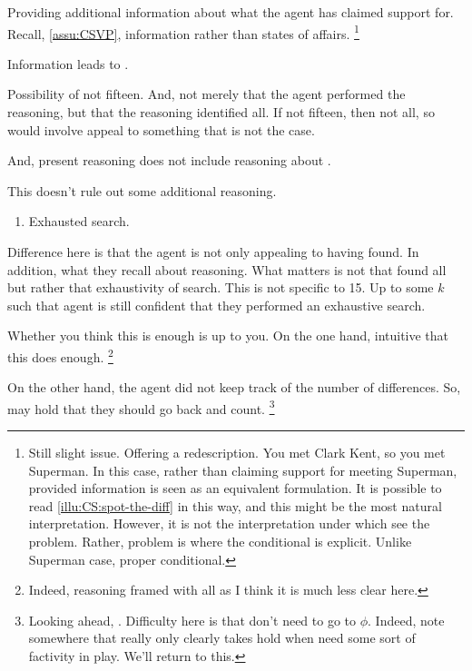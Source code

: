 \begin{note}
    Providing additional information about what the agent has claimed support for.
  Recall, \autoref{assu:CSVP}, information rather than states of affairs.
  \nolinebreak
  \footnote{
    Still slight issue.
    Offering a redescription.
    You met Clark Kent, so you met Superman.
    In this case, rather than claiming support for meeting Superman, provided information is seen as an equivalent formulation.
    It is possible to read \autoref{illu:CS:spot-the-diff} in this way, and this might be the most natural interpretation.
    However, it is not the interpretation under which see the problem.
    Rather, problem is where the conditional is explicit.
    Unlike Superman case, proper conditional.
  }
\end{note}

\begin{note}
  Information leads to \requ{}.

  Possibility of not fifteen.
  And, not merely that the agent performed the reasoning, but that the reasoning identified all.
  If not fifteen, then not all, so would involve appeal to something that is not the case.

  And, present reasoning does not include reasoning about \requ{}.
\end{note}

\begin{note}
  This doesn't rule out some additional reasoning.
  \begin{enumerate}
  \item Exhausted search.
  \end{enumerate}
  Difference here is that the agent is not only appealing to having found.
  In addition, what they recall about reasoning.
  What matters is not that found all but rather that exhaustivity of search.
  This is not specific to 15.
  Up to some \(k\) such that agent is still confident that they performed an exhaustive search.

  Whether you think this is enough is up to you.
  On the one hand, intuitive that this does enough.\nolinebreak
  \footnote{
    Indeed, reasoning framed with all as I think it is much less clear here.
  }

  On the other hand, the agent did not keep track of the number of differences.
  So, may hold that they should go back and count.\nolinebreak
  \footnote{
    Looking ahead, \nI{}.
    Difficulty here is that don't need to go to \(\phi\).
    Indeed, note somewhere that \nI{} really only clearly takes hold when need some sort of factivity in play.
    We'll return to this.
  }
\end{note}


